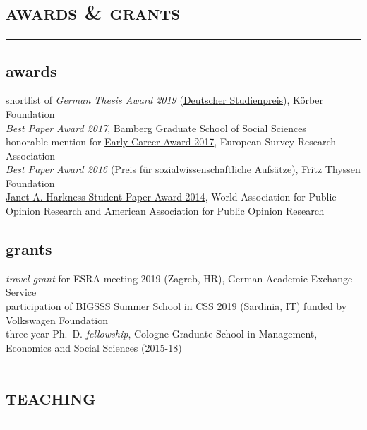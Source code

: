 \documentclass[11pt, a4paper]{article}
\begin{document}
\section*{\textsc{awards \& grants}}
\vskip-20pt{\noindent\rule{\textwidth}{1pt}}
\subsection*{awards}
shortlist of \textit{German Thesis Award 2019} (\href{https://www.koerber-stiftung.de/fileadmin/user_upload/koerber-stiftung/redaktion/deutscher-studienpreis/pdf/2019/2019_Nominierte_SozialWissenschaften.pdf}{Deutscher Studienpreis}), Körber Foundation\\
\textit{Best Paper Award 2017}, Bamberg Graduate School of Social Sciences\\
honorable mention for \href{https://wapor.org/events/annual-conference/awards-funds/janet-a-harkness-student-paper-award/}{Early Career Award 2017}, European Survey Research Association\\
\textit{Best Paper Award 2016} (\href{https://www.fritz-thyssen-stiftung.de/cms/wp-content/uploads/2018/06/Jahresbericht_2017_interaktiv.pdf}{Preis für sozialwissenschaftliche Aufsätze}), Fritz Thyssen Foundation\\
\href{https://wapor.org/events/annual-conference/awards-funds/janet-a-harkness-student-paper-award/}{Janet A. Harkness Student Paper Award 2014}, World Association for Public Opinion Research and American Association for Public Opinion Research\\
\subsection*{grants}
\textit{travel grant} for ESRA meeting 2019 (Zagreb, HR), German Academic Exchange Service\\
participation of BIGSSS Summer School in CSS 2019 (Sardinia, IT) funded by Volkswagen Foundation\\
three-year Ph.~D. \textit{fellowship}, Cologne Graduate School in Management, Economics and Social Sciences (2015-18)
\section*{\textsc{teaching}}
\vskip-20pt{\noindent\rule{\textwidth}{1pt}}
\noindent
\end{document}
